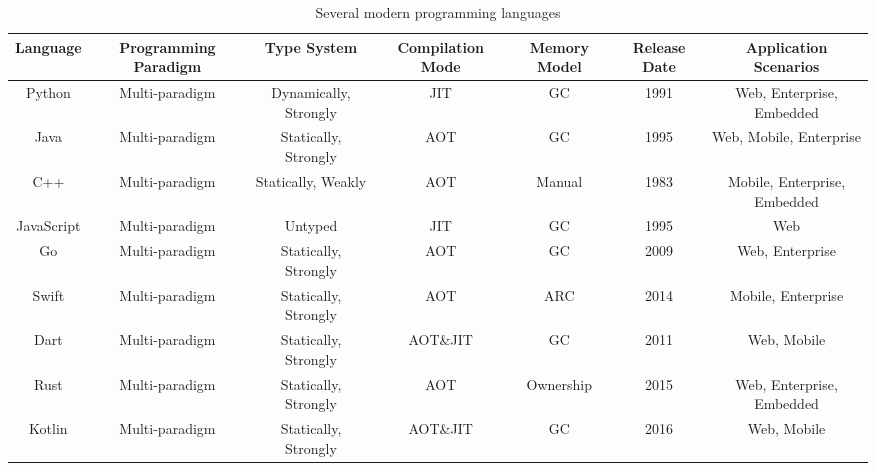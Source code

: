 \begin{table}[ht]
    \caption{Several modern programming languages}
    \label{tab:selected-languages}
    \begin{center}
        \begin{tabular}{ccccccc}
            \toprule
            Language & Programming Paradigm & Type System & Compilation Mode & Memory Model &
            Release Date & Application Scenarios \\
            \midrule
            Python & Multi-paradigm & Dynamically, Strongly & JIT & GC & 1991 & Web,
            Enterprise, Embedded \\
            Java & Multi-paradigm & Statically, Strongly & AOT & GC & 1995 & Web,
            Mobile, Enterprise \\
            C++ & Multi-paradigm & Statically, Weakly & AOT & Manual & 1983 & Mobile,
            Enterprise, Embedded \\
            JavaScript & Multi-paradigm & Untyped & JIT & GC & 1995 &
            Web \\
            Go & Multi-paradigm & Statically, Strongly & AOT & GC & 2009 & Web,
            Enterprise \\
            Swift & Multi-paradigm & Statically, Strongly & AOT & ARC & 2014 &
            Mobile, Enterprise \\
            Dart & Multi-paradigm & Statically, Strongly & AOT\&JIT & GC & 2011 &
            Web, Mobile \\
            Rust & Multi-paradigm & Statically, Strongly & AOT & Ownership & 2015 &
            Web, Enterprise, Embedded \\
            Kotlin & Multi-paradigm & Statically, Strongly & AOT\&JIT & GC & 2016 &
            Web, Mobile \\
            \bottomrule
        \end{tabular}
    \end{center}
\end{table}



